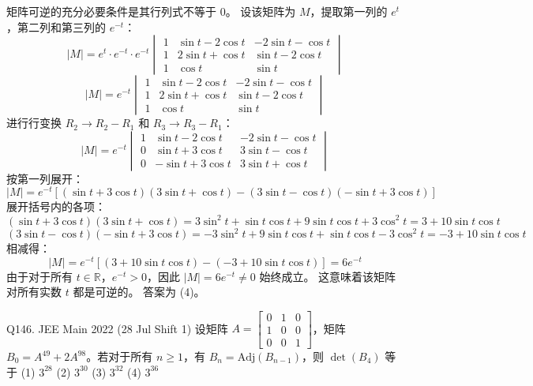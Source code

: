 \begin{questions}
\begin{solution}
矩阵可逆的充分必要条件是其行列式不等于 $0$。
设该矩阵为 $M$，提取第一列的 $e^t$，第二列和第三列的 $e^{-t}$：
\[
|M| = e^t \cdot e^{-t} \cdot e^{-t} \begin{vmatrix} 
1 & \sin t - 2 \cos t & -2 \sin t - \cos t \\ 
1 & 2 \sin t + \cos t & \sin t - 2 \cos t \\ 
1 & \cos t & \sin t 
\end{vmatrix}
\]
\[
|M| = e^{-t} \begin{vmatrix} 
1 & \sin t - 2 \cos t & -2 \sin t - \cos t \\ 
1 & 2 \sin t + \cos t & \sin t - 2 \cos t \\ 
1 & \cos t & \sin t 
\end{vmatrix}
\]
进行行变换 $R_2 \to R_2 - R_1$ 和 $R_3 \to R_3 - R_1$：
\[
|M| = e^{-t} \begin{vmatrix} 
1 & \sin t - 2 \cos t & -2 \sin t - \cos t \\ 
0 & \sin t + 3 \cos t & 3 \sin t - \cos t \\ 
0 & -\sin t + 3 \cos t & 3 \sin t + \cos t 
\end{vmatrix}
\]
按第一列展开：
\[
|M| = e^{-t} [(\sin t + 3 \cos t)(3 \sin t + \cos t) - (3 \sin t - \cos t)(-\sin t + 3 \cos t)]
\]
展开括号内的各项：
\[
(\sin t + 3 \cos t)(3 \sin t + \cos t) = 3 \sin^2 t + \sin t \cos t + 9 \sin t \cos t + 3 \cos^2 t = 3 + 10 \sin t \cos t
\]
\[
(3 \sin t - \cos t)(-\sin t + 3 \cos t) = -3 \sin^2 t + 9 \sin t \cos t + \sin t \cos t - 3 \cos^2 t = -3 + 10 \sin t \cos t
\]
相减得：
\[
|M| = e^{-t} [(3 + 10 \sin t \cos t) - (-3 + 10 \sin t \cos t)] = 6e^{-t}
\]
由于对于所有 $t \in \mathbb{R}$，$e^{-t} > 0$，因此 $|M| = 6e^{-t} \neq 0$ 始终成立。
这意味着该矩阵对所有实数 $t$ 都是可逆的。
答案为 (4)。
\end{solution}

\question
Q146. JEE Main 2022 (28 Jul Shift 1)
设矩阵 $A = \begin{bmatrix} 0 & 1 & 0 \\ 1 & 0 & 0 \\ 0 & 0 & 1 \end{bmatrix}$，矩阵 $B_0 = A^{49} + 2A^{98}$。若对于所有 $n \ge 1$，有 $B_n = \text{Adj}(B_{n-1})$，则 $\det(B_4)$ 等于
(1) $3^{28}$ \quad (2) $3^{30}$ \quad (3) $3^{32}$ \quad (4) $3^{36}$


\end{questions}
